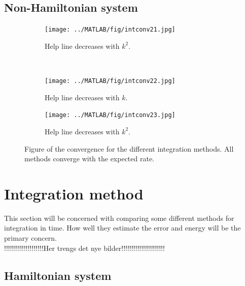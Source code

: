 \subsection{Non-Hamiltonian system}%
\begin{figure}[H]
        \centering
        \begin{subfigure}[b]{0.30\textwidth}
                \texttt{[image: ../MATLAB/fig/intconv21.jpg]}
                \caption{ Help line decreases with $k^2$. }
                \label{fig:intconvtrap2}
        \end{subfigure}
        ~
        \begin{subfigure}[b]{0.30\textwidth}
                \texttt{[image: ../MATLAB/fig/intconv22.jpg]}
                \caption{ Help line decreases with $k$. }
                \label{fig:intconveul2}
        \end{subfigure}
        \begin{subfigure}[b]{0.30\textwidth}
                \texttt{[image: ../MATLAB/fig/intconv23.jpg]}
                \caption{ Help line decreases with $k^2$. }
                \label{fig:intconvmid2}
        \end{subfigure}
\caption{Figure of the convergence for the different integration methods. All methods converge with the expected rate.}
\label{fig:intconv2}
\end{figure}


\section{Integration method} %
This section will be concerned with comparing some different methods for integration in time. How well they estimate the error and energy will be the primary concern. \\
!!!!!!!!!!!!!!!!!!!!Her trengs det nye bilder!!!!!!!!!!!!!!!!!!!!!!\\


\subsection{Hamiltonian system}%


